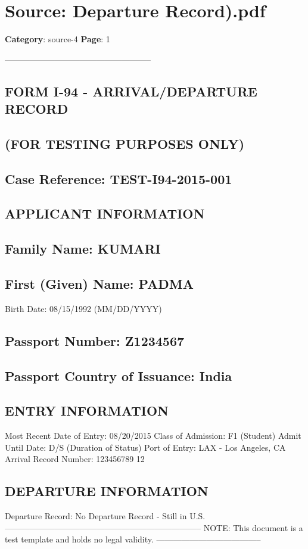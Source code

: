 \section*{Source: Departure Record).pdf}
\textbf{Category}: source-4
\textbf{Page}: 1

-----------------------------------------------------

\subsection*{FORM I-94 - ARRIVAL/DEPARTURE RECORD}

\subsection*{(FOR TESTING PURPOSES ONLY)}

\subsection*{Case Reference: TEST-I94-2015-001}

\subsection*{APPLICANT INFORMATION}

\subsection*{Family Name: KUMARI}

\subsection*{First (Given) Name: PADMA}

Birth Date: 08/15/1992 (MM/DD/YYYY)

\subsection*{Passport Number: Z1234567}

\subsection*{Passport Country of Issuance: India}

\subsection*{ENTRY INFORMATION}

Most Recent Date of Entry: 08/20/2015 Class of Admission: F1 (Student) Admit Until Date: D/S (Duration of Status) Port of Entry: LAX - Los Angeles, CA Arrival Record Number: 123456789 12

\subsection*{DEPARTURE INFORMATION}

Departure Record: No Departure Record - Still in U.S. ----------------------------------------------------------------------- NOTE: This document is a test template and holds no legal validity. --------------------------------------